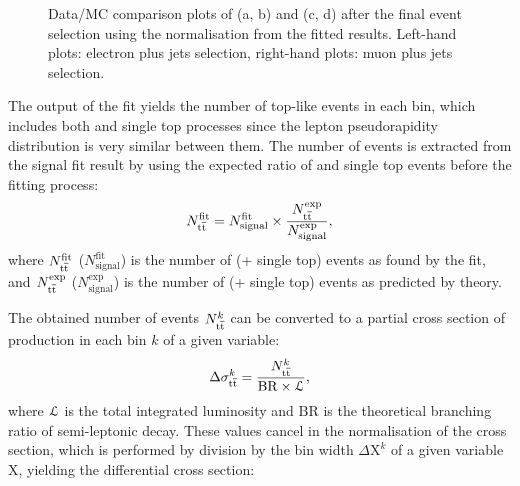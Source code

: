 \begin{figure}[!htbp]
    \caption{Data/MC comparison plots of \WPT (a, b) and \MT (c, d) after the final event selection using the
    normalisation from the fitted results. Left-hand plots: electron plus jets selection, right-hand plots: muon plus
    jets selection.}
    \label{fig:fitted_WPT_MT}
\end{figure}

The output of the fit yields the number of top-like events in each bin, which includes both \ttbar and single top
processes since the lepton pseudorapidity distribution is very similar between them. The number of \ttbar events is
extracted from the signal fit result by using the expected ratio of \ttbar and single top events before the fitting
process:
\begin{equation}
\label{eq:xsection_decomposition}
N_{\mathrm{t}\overline{\mathrm{t}}}^{\text{fit}} = N_{\text{signal}}^{\text{fit}} \times \frac{N_{\mathrm{t}\overline{\mathrm{t}}}^{\text{exp}}}{N_{\text{signal}}^{\text{exp}}},
\end{equation}
where $N_{\mathrm{t}\overline{\mathrm{t}}}^{\text{fit}}$ ($N_{\text{signal}}^{\text{fit}}$) is the number of \ttbar (\ttbar + single top) events
as found by the fit, and $N_{\mathrm{t}\overline{\mathrm{t}}}^{\text{exp}}$ ($N_{\text{signal}}^{\text{exp}}$) is the number of \ttbar (\ttbar +
single top) events as predicted by theory.

The obtained number of \ttbar events $N_{\mathrm{t}\overline{\mathrm{t}}}^k$ can be converted to a partial cross section of \ttbar production in
each bin $k$ of a given variable:
\begin{equation}
\label{eq:partial_xsection}
\Delta\sigma_{\mathrm{t}\overline{\mathrm{t}}}^k = \frac{N_{\mathrm{t}\overline{\mathrm{t}}}^k}{\mathrm{BR} \times {\cal L}},
\end{equation}
where $\cal L$ is the total integrated luminosity and $\mathrm{BR}$ is the theoretical branching ratio of semi-leptonic
\ttbar decay. These values cancel in the normalisation of the cross section, which is performed by division by the bin
width $\Delta \mathrm{X}^k$ of a given variable $\mathrm{X}$, yielding the differential cross section:

